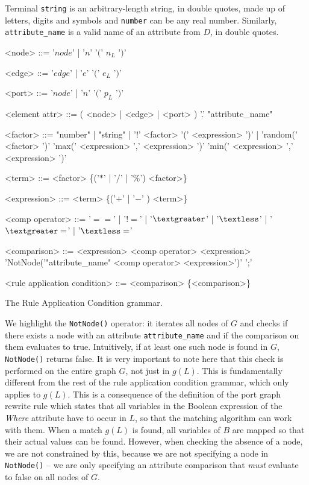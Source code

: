 \documentclass[a4paper,10pt,runningheads]{llncs}
\newcommand{\NotNode}[1]{{\tt NotNode(}#1{\tt )}}
\begin{document}
Terminal {\tt string} is an arbitrary-length string, in double quotes, made up of letters, digits and symbols 
and {\tt number} can be any real number.
Similarly, {\tt attribute\_name} is a valid name of an attribute from $D$, in double quotes.

\begin{table}[!htb]
\renewcommand{\arraystretch}{1.4}
\centering
\begin{framed}    
\begin{flushleft}
\begin{grammar}
    <node> ::= '$node$' | '$n$' '$($' $n_L$ '$)$'

    <edge> ::= '$edge$' | '$e$' '$($' $e_L$ '$)$'
    
    <port> ::= '$node$' | '$n$' '$($' $p_L$ '$)$'

    <element attr> ::= ( <node> | <edge> | <port> ) '.' "attribute_name"

    <factor> ::= "number" | "string"
     | '$!$' <factor>
    \alt '(' <expression> ')' | 'random(' <factor> ')'
    \alt 'max(' <expression> ',' <expression> ')'
    \alt 'min(' <expression> ',' <expression> ')'

    <term> ::= <factor> \{('$*$' | '$/$' | '$\%$') <factor>\}

    <expression> ::= <term> \{('$+$' | '$-$' ) <term>\}

    <comp operator> ::= '$==$' | '$!=$' | '$\textgreater$' | '$\textless$' | '$\textgreater=$' | '$\textless=$'

    <comparison> ::= <expression> <comp operator> <expression>
    \alt 'NotNode('"attribute_name" <comp operator> <expression>')' ';'

    <rule application condition> ::= <comparison> \{<comparison>\}
\end{grammar}
\end{flushleft}
\end{framed}
\caption{The Rule Application Condition grammar.}
\label{table:rulecondgrammar}
\end{table}

We highlight the \NotNode{} operator: it iterates all nodes of $G$ and checks if there exists a node with an attribute {\tt attribute\_name} and if the comparison on them evaluates to true. Intuitively, if at least one such node is found in $G$, \NotNode{} returns false. It is very important to note here that this check is performed on the entire graph $G$, not just in $g(L)$. This is fundamentally different from the rest of the rule application condition grammar, which only applies to $g(L)$. This is a consequence of the definition of the port graph rewrite rule which states that all variables in the Boolean expression of the \emph{Where} attribute have to occur in $L$, so that the matching algorithm can work with them. When a match $g(L)$ is found, all variables of $B$ are mapped so that their actual values can be found. However, when checking the absence of a node, we are not constrained by this, because we are not specifying a node in \NotNode{} -- we are only specifying an attribute comparison that \emph{must} evaluate to false on all nodes of $G$.
\end{document}
